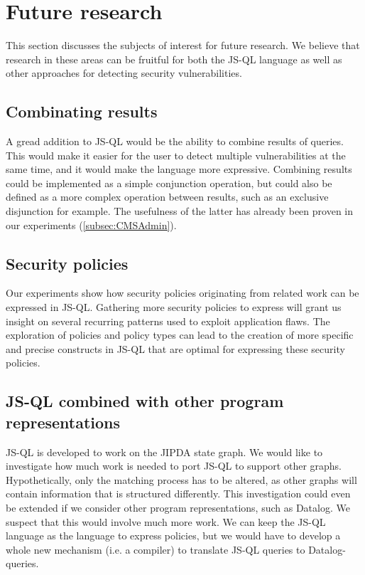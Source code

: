 \section{Future research}

This section discusses the subjects of interest for future research. We believe that research in these areas can be fruitful for both the JS-QL language as well as other approaches for detecting security vulnerabilities.

\subsection*{Combinating results}

A gread addition to JS-QL would be the ability to combine results of queries. This would make it easier for the user to detect multiple vulnerabilities at the same time, and it would make the language more expressive. Combining results could be implemented as a simple conjunction operation, but could also be defined as a more complex operation between results, such as an exclusive disjunction for example. The usefulness of the latter has already been proven in our experiments (\ref{subsec:CMSAdmin}).

\subsection*{Security policies}
Our experiments show how security policies originating from related work can be expressed in JS-QL. Gathering more security policies to express will grant us insight on several recurring patterns used to exploit application flaws. The exploration of policies and policy types can lead to the creation of more specific and precise constructs in JS-QL that are optimal for expressing these security policies.

\subsection*{JS-QL combined with other program representations}
JS-QL is developed to work on the JIPDA state graph. We would like to investigate how much work is needed to port JS-QL to support other graphs. Hypothetically, only the matching process has to be altered, as other graphs will contain information that is structured differently. This investigation could even be extended if we consider other program representations, such as Datalog. We suspect that this would involve much more work. We can keep the JS-QL language as the language to express policies, but we would have to develop a whole new mechanism (i.e. a compiler) to translate JS-QL queries to Datalog-queries.


